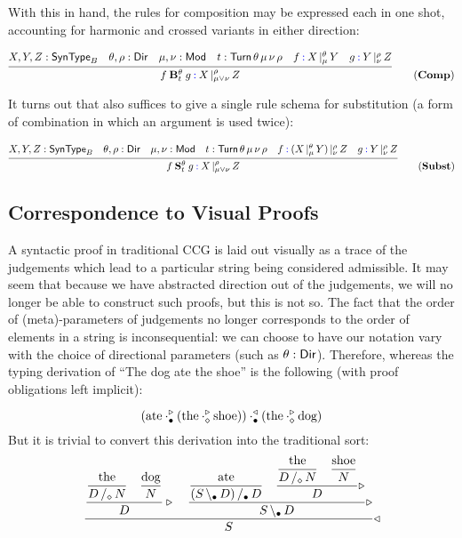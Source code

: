 \documentclass{amsart}
\begin{document}
With this in hand, the rules for composition may be expressed each in
one shot, accounting for harmonic and crossed variants in either
direction:

\begin{equation}
  \infer{f \mathbin{\bf B}_t^\theta g \syn: \arrty X|[\rho,\mu\lor\nu]Z}
  {
    X, Y, Z : \ty{SynType}_B &
    \theta,\rho : \ty{Dir} &
    \mu,\nu : \ty{Mod} &
    t : \ty{Turn}\,\theta\,\mu\,\nu\,\rho &
    f \syn: \arrty X|[\theta,\mu] Y &
    g \syn: \arrty Y|[\rho,\nu] Z
  }\tag{$\mathbf{Comp}$}
\end{equation}

It turns out that  also suffices to give a single rule schema
for substitution (a form of combination in which an argument is used
twice):

\begin{equation}
  \infer{f \mathbin{\bf S}_t^\theta g \syn: \arrty X|[\rho,\mu\lor\nu]Z}
  {
    X, Y, Z : \ty{SynType}_B &
    \theta,\rho : \ty{Dir} &
    \mu,\nu : \ty{Mod} &
    t : \ty{Turn}\,\theta\,\mu\,\nu\,\rho &
    f \syn: \arrty {(\arrty X|[\theta,\mu]Y)} |[ \rho,\nu] Z &
    g \syn: \arrty Y|[\rho,\nu]Z
  }\tag{$\mathbf{Subst}$}
\end{equation}

\subsection{Correspondence to Visual Proofs}

A syntactic proof in traditional CCG is laid out visually as a trace of
the judgements which lead to a particular string being considered
admissible. It may seem that because we have abstracted direction out of
the judgements, we will no longer be able to construct such proofs, but
this is not so. The fact that the order of (meta)-parameters of
judgements no longer corresponds to the order of elements in a string is
inconsequential: we can choose to have our notation vary with the choice
of directional parameters (such as $\theta:\mathsf{Dir}$). Therefore,
whereas the typing derivation of ``The dog ate the shoe'' is the
following (with proof obligations left implicit):

\[
  (\text{ate} \cdot^\triangleright_{\mathsf{\bullet}} (\text{the} \cdot^\triangleright_{\mathsf{\diamond}}
\text{shoe})) \cdot^\triangleleft_{\mathsf{\bullet}} (\text{the} \cdot^\triangleright_{\mathsf{\diamond}}
\text{dog})
\]
But it is trivial to convert this derivation into the traditional sort:
\[
  \dfrac{
    \dfrac{
      \dfrac{\text{the}}{\rarrty D|[\con\diamond]N}
      \quad
      \dfrac{\text{dog}}{N}
    }{D}\triangleright
    \quad
    \dfrac{
      \dfrac{\text{ate}}{\rarrty {(\larrty S|[\con\bullet]D)}|[\con\bullet]D}
      \quad
      \dfrac{
        \dfrac{\text{the}}{\rarrty D|[\con\diamond]N}
        \quad
        \dfrac{\text{shoe}}{N}
      }{D}\triangleright
    }{\larrty S|[\con\bullet]D}\triangleright
  }{S}\triangleleft
\]
\end{document}
